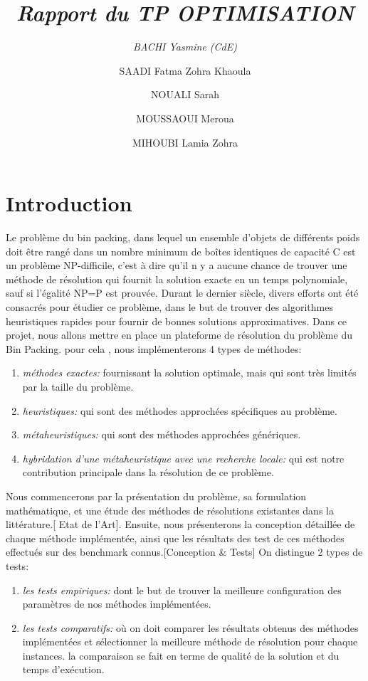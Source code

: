\documentclass[12pt,a4paper, titlepage]{report}
\title{\emph{Rapport du TP OPTIMISATION} }
\author{ 
    \emph{BACHI Yasmine (CdE)}
    \and
    SAADI Fatma Zohra Khaoula
    \and 
    NOUALI Sarah
    \and 
    MOUSSAOUI Meroua
    \and 
    MIHOUBI Lamia Zohra}
\begin{document}
    \maketitle
    \tableofcontents
    \chapter*{Introduction}
      
    Le problème du bin packing, dans lequel un ensemble d’objets de différents poids doit être rangé dans un nombre minimum de boîtes identiques de capacité C est un problème NP-difficile, c’est à dire qu’il n y a aucune chance de trouver une méthode de résolution qui fournit la solution exacte en un temps polynomiale, sauf si l’égalité NP=P est prouvée. 
    Durant le dernier siècle, divers efforts ont été consacrés pour étudier ce problème, dans le but de trouver des algorithmes heuristiques rapides pour fournir de bonnes solutions approximatives.
    Dans ce projet, nous allons mettre en place un plateforme de résolution du problème du Bin Packing. pour cela , nous implémenterons 4 types de méthodes: 
    \begin{enumerate}
        \item \emph{méthodes exactes:} fournissant la solution optimale, mais qui sont très limités par la taille du problème. 
        \item \emph{heuristiques:} qui sont des méthodes approchées spécifiques au problème.
        \item \emph{métaheuristiques:} qui sont des méthodes approchées génériques.
        \item \emph{hybridation d'une métaheuristique avec une recherche locale:} qui est notre contribution principale dans la résolution de ce problème.
    \end{enumerate}
    Nous commencerons par la présentation du problème, sa formulation mathématique, et une étude des méthodes de résolutions existantes dans la littérature.[ Etat de l’Art]. Ensuite, nous présenterons la conception détaillée de chaque méthode implémentée, ainsi que les résultats des test de ces méthodes effectués sur des benchmark connus.[Conception \& Tests]
    On distingue 2 types de tests:
    \begin{enumerate}
        \item \emph{les tests empiriques:} dont le but de trouver la meilleure configuration des paramètres de nos méthodes implémentées.  
        \item \emph{les tests comparatifs:} où on doit comparer les résultats obtenus des méthodes implémentées et sélectionner la meilleure méthode de résolution pour chaque instances. la comparaison se fait en terme de qualité de la solution et du temps d'exécution. 
    \end{enumerate}
\end{document}

